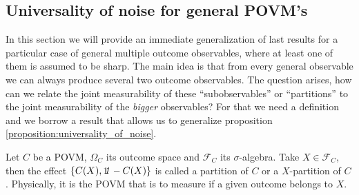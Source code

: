\documentclass[10pt, a4paper]{amsart}
\begin{document}
\newpage
\subsection{Universality of noise for general POVM's }

In this section we will provide an immediate generalization of last results for a particular case of general multiple outcome observables, where at least one of them is assumed to be sharp. The main idea is that from every general observable we can always produce several two outcome observables. The question arises, how can we relate the joint measurability of these ``subobservables'' or ``partitions'' to the joint measurability of the \textit{bigger} observables? For that we need a definition and we borrow a result that allows us to generalize proposition \ref{proposition:universality_of_noise}.  
\begin{definition}
Let $C$ be a POVM, $\Omega_{C}$ its outcome space and $\mathcal{F}_{C}$ its $\sigma$-algebra. Take $X\in \mathcal{F}_{C}$, then 
the effect $\{C(X), \mathit{\bbone} - C(X)\}$ is called a partition of $C$ or a $X$-partition of $C$. Physically, it is the POVM that is to measure if a given outcome belongs to $X$. 
\end{definition}
\end{document}
